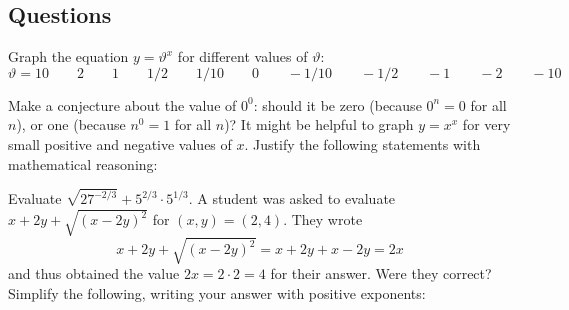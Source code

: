 \subsection*{Questions}
\begin{questions}
  \question Graph the equation $ y = \vartheta^x $ for different values of $ \vartheta $:
            \begin{displaymath}
              \vartheta = 10\qquad 2\qquad 1\qquad 1/2\qquad 1/10\qquad 0\qquad -1/10\qquad -1/2\qquad -1\qquad -2\qquad -10
            \end{displaymath}
  \question Make a conjecture about the value of $ 0^0 $: should it be zero (because $ 0^n = 0 $ for all $ n $), or one (because $ n^0 = 1 $ for all $ n $)?
            It might be helpful to graph $ y = x^x $ for very small positive and negative values of $ x $.
  \question Justify the following statements with mathematical reasoning:
  \question Evaluate $ \sqrt{27^{-2/3}} + 5^{2/3} \cdot 5^{1/3} $.
  \question A student was asked to evaluate $ x + 2y + \sqrt{(x - 2y)^2} $ for $ (x,y) = (2,4) $. They wrote
            \begin{displaymath}
              x + 2y + \sqrt{(x - 2y)^2} = x + 2y + x - 2y = 2x
            \end{displaymath}
            and thus obtained the value $ 2x = 2 \cdot 2 = 4 $ for their answer. Were they correct?
  \question Simplify the following, writing your answer with positive exponents:
    \begin{parts}

\end{parts}
\end{questions}
